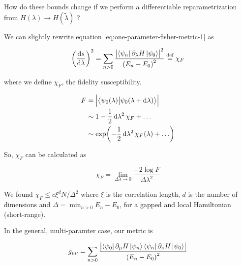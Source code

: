 \documentclass[main.tex]{subfiles}
\begin{document}
%
%

How do these bounds change if we perform a differentiable reparametrization from \(H(\lambda) \rightarrow H(\widetilde{\lambda} )\) ?

We can slightly rewrite equation \eqref{eq:one-parameter-fisher-metric-1} as

\begin{equation}
    \qty(\dv{s}{\lambda} )^2
    = \sum _{n>0}  \frac{\abs{\bra{\psi_n} \partial_ \lambda H \ket{\psi_0}  }^2 }{\qty(E_n - E_0)^2}
    \defeq \chi_F
\end{equation}

where we define \( \chi_F \),  the fidelity susceptibility.

\begin{subequations}
\begin{align}
    F &= \abs{\braket{\psi_0 (\lambda)}{\psi_0(\lambda + \dd{\lambda} )}} \\
    &\sim 1 - \frac{1}{2}\dd{\lambda^2} \chi_F + \dots \\
    &\sim \exp(- \frac{1}{2}\dd{\lambda^2} \chi_F (\lambda) + \dots )
\end{align}
\end{subequations}

So, \(\chi_F\) can be calculated as

\begin{equation} \label{eq:fidelity-chi-logF}
    \chi_F = \lim_{\Delta \lambda \rightarrow 0} \frac{-2 \log F}{\Delta \lambda^2}
\end{equation}

We found \(\chi_F \leq c \xi^d N / \Delta^2\) where \(\xi\) is the correlation length, \(d\) is the number of dimensions and \(\Delta = \min_{n>0} E_n - E_0\), for a gapped and local Hamiltonian (short-range).

In the general, multi-paramter case, our metric is

\begin{equation}
    g _{\mu \nu} = \sum _{n>0}
    \frac{\abs{\bra{\psi_0} \partial_ \mu H \ket{\psi_n} \bra{\psi_n} \partial_ \nu  H \ket{\psi_0} } }{\qty(E_n - E_0)^2}
\end{equation}
\end{document}
